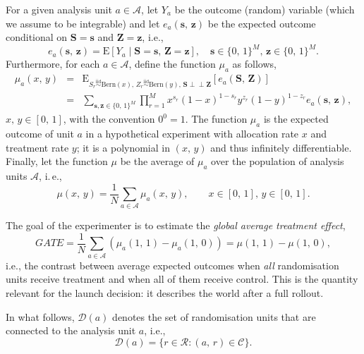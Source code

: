 \documentclass[sigconf,anonymous,review]{acmart}
\newcommand{\E}{\mathrm E}
\newcommand{\iidsim}{{\stackrel{\mathrm{iid}}{\sim}}}
\newcommand{\ind}{\perp\!\!\!\perp}
\begin{document}
For a given analysis unit $a\in\mathcal A$, let $Y_a$ be the outcome (random) variable (which we assume to be integrable) and let $e_a(\mathbf{s},\,\mathbf{z})$
be the expected outcome conditional on $\mathbf S = \mathbf s$ and $\mathbf Z = \mathbf z$, i.e.,
\begin{equation}\label{eq:ea}
    e_a(\mathbf{s},\,\mathbf{z}) = \E[Y_a\mid \mathbf{S} = \mathbf{s},\,\mathbf{Z}=\mathbf{z}],\quad \mathbf{s}\in \{0,\,1\}^M,\, \mathbf{z}\in \{0,\,1\}^M.
\end{equation}
Furthermore, for each $a\in\mathcal{A}$, define the function $\mu_a$ as follows,
\begin{eqnarray}\label{eq:ma}
    \mu_a(x,\,y) &=& \E_{S_r\iidsim \mathrm{Bern}(x),\,Z_r\iidsim \mathrm{Bern}(y),\,\mathbf S\ind \mathbf Z}[e_a(\mathbf S,\,\mathbf Z)]\nonumber\\
    &=& \sum_{\textbf{s},\textbf{z}\in \{0,\,1\}^M}\prod_{r=1}^Mx^{s_r}(1-x)^{1-s_r}y^{z_r}(1-y)^{1-z_r}e_a(\textbf{s},\,\textbf{z}),
\end{eqnarray}
$x,\,y\in[0,\,1]$, with the convention $0^0=1$. The function $\mu_a$ is the expected outcome of unit $a$ in a hypothetical experiment with allocation rate $x$ and treatment rate $y$; it is a polynomial in $(x,\,y)$ and thus infinitely differentiable. Finally, let the function $\mu$ be the average of $\mu_a$ over the population of analysis units $\mathcal{A}$, i.\,e.,
\begin{equation}\label{eq:mu}
    \mu(x,\,y) = \frac 1 N \sum_{a\in\mathcal{A}} \mu_a(x,\,y),\qquad x\in[0,\,1],\, y\in[0,\,1].
\end{equation}

The goal of the experimenter is to estimate the \emph{global average treatment effect},
\begin{equation}\label{eq:gate}
    GATE = \frac 1 N\sum_{a\in\mathcal A} \left(\mu_a(1,\,1) - \mu_a(1,\,0)\right) = \mu(1,\,1) - \mu(1,\,0),
\end{equation}
i.e., the contrast between average expected outcomes when \emph{all} randomisation units receive treatment and when all of them receive control. This is the quantity relevant for the launch decision: it describes the world after a full rollout.

In what follows, $\mathcal D(a)$ denotes the set of randomisation units that are connected to the analysis unit $a$, i.e.,
\begin{equation*}
    \mathcal{D}(a) = \{r\in\mathcal{R}\colon (a,\,r)\in \mathcal{C}\}.
\end{equation*}
\end{document}
